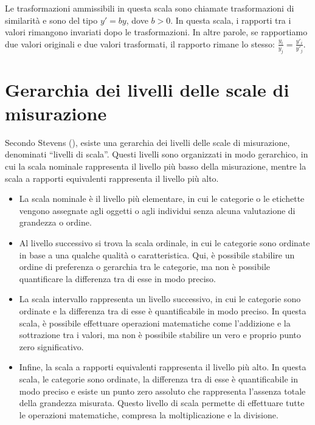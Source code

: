 \documentclass[
  letterpaper,
  DIV=11,
  numbers=noendperiod]{scrreprt}
\providecommand{\tightlist}{%
  \setlength{\itemsep}{0pt}\setlength{\parskip}{0pt}}\usepackage{longtable,booktabs,array}
\theoremstyle{definition}
\theoremstyle{remark}
\begin{document}
Le trasformazioni ammissibili in questa scala sono chiamate
trasformazioni di similarità e sono del tipo \(y' = by\), dove \(b>0\).
In questa scala, i rapporti tra i valori rimangono invariati dopo le
trasformazioni. In altre parole, se rapportiamo due valori originali e
due valori trasformati, il rapporto rimane lo stesso:
\(\frac{y_i}{y_j} = \frac{y'_i}{y'_j}\).

\section{Gerarchia dei livelli delle scale di
misurazione}\label{gerarchia-dei-livelli-delle-scale-di-misurazione}

Secondo Stevens (), esiste una gerarchia
dei livelli delle scale di misurazione, denominati ``livelli di scala''.
Questi livelli sono organizzati in modo gerarchico, in cui la scala
nominale rappresenta il livello più basso della misurazione, mentre la
scala a rapporti equivalenti rappresenta il livello più alto.

\begin{itemize}
\tightlist
\item
  La scala nominale è il livello più elementare, in cui le categorie o
  le etichette vengono assegnate agli oggetti o agli individui senza
  alcuna valutazione di grandezza o ordine.
\item
  Al livello successivo si trova la scala ordinale, in cui le categorie
  sono ordinate in base a una qualche qualità o caratteristica. Qui, è
  possibile stabilire un ordine di preferenza o gerarchia tra le
  categorie, ma non è possibile quantificare la differenza tra di esse
  in modo preciso.
\item
  La scala intervallo rappresenta un livello successivo, in cui le
  categorie sono ordinate e la differenza tra di esse è quantificabile
  in modo preciso. In questa scala, è possibile effettuare operazioni
  matematiche come l'addizione e la sottrazione tra i valori, ma non è
  possibile stabilire un vero e proprio punto zero significativo.
\item
  Infine, la scala a rapporti equivalenti rappresenta il livello più
  alto. In questa scala, le categorie sono ordinate, la differenza tra
  di esse è quantificabile in modo preciso e esiste un punto zero
  assoluto che rappresenta l'assenza totale della grandezza misurata.
  Questo livello di scala permette di effettuare tutte le operazioni
  matematiche, compresa la moltiplicazione e la divisione.
\end{itemize}
\end{document}

